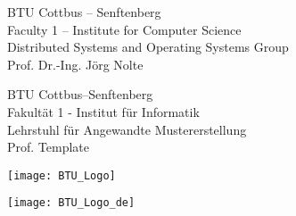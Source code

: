 %
%
%
\begin{en}
\end{en}
\begin{de}
\end{de}
%
\thispagestyle{empty}
%
%
\begin{figure}[ht]
\begin{minipage}[l]{0.65\textwidth}
\begin{flushleft}
\begin{en}
	BTU Cottbus -- Senftenberg\\[0.3em]
    Faculty 1 -- Institute for Computer Science\\[0.3em]
    Distributed Systems and Operating Systems Group\\[0.3em]
    Prof. Dr.-Ing. J\"org Nolte
\end{en}
\begin{de}
    BTU Cottbus–Senftenberg\\[0.3em]
    Fakult\"at 1 - Institut f\"ur Informatik\\[0.3em]
    Lehrstuhl f\"ur Angewandte Mustererstellung\\[0.3em]
    Prof. Template
\end{de}
\end{flushleft}
\end{minipage}%
\begin{minipage}[r]{0.35\textwidth}
\begin{flushright}
\begin{en}
	\texttt{[image: BTU\_Logo]}
\end{en}
\begin{de}
	\texttt{[image: BTU\_Logo\_de]}
\end{de}
\end{flushright}
\end{minipage}
\end{figure}

